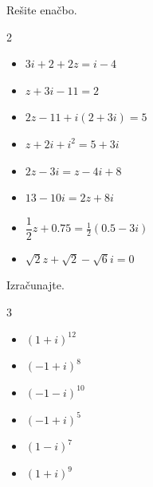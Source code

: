             \begin{naloga}
                Rešite enačbo.

                \begin{multicols}{2}
                    
                \begin{itemize}
                        \item $3i+2+2z=i-4$ 
                        \item $z+3i-11=2$ 
                        \item $2z-11+i\left(2+3i\right)=5$ 
                        \item $z+2i+i^2=5+3i$ 
                        \item $2z-3i=z-4i+8$ 
                        \item $13-10i=2z+8i$ 
                        \item $\dfrac{1}{2}z+0.75=\frac{1}{2}\left(0.5-3i\right)$ 
                        \item $\sqrt{2}z+\sqrt{2}-\sqrt{6}i=0$ 
                    \end{itemize}
                \end{multicols}

            \end{naloga}


            \begin{naloga}
                Izračunajte.

                \begin{multicols}{3}
                \begin{itemize}
                        \item $\left(1+i\right)^{12}$ 
                        \item $\left(-1+i\right)^8$ 
                        \item $\left(-1-i\right)^{10}$ 
                        \item $\left(-1+i\right)^5$ 
                        \item $\left(1-i\right)^7$ 
                        \item $\left(1+i\right)^9$ 
                    \end{itemize}
                \end{multicols}

            \end{naloga}

